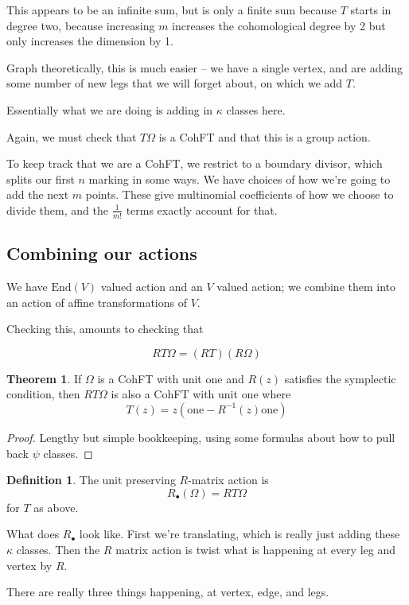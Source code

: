 \documentclass{amsart}
\theoremstyle{definition}
\newtheorem{theorem}{Theorem}
\newtheorem{definition}{Definition}
\newcommand{\one}{\text{one}}
\newcommand{\End}{\text{End}}
\begin{document}
This appears to be an infinite sum, but is only a finite sum because $T$ starts in degree two, because increasing $m$ increases the cohomological degree by 2 but only increases the dimension by 1.

Graph theoretically, this is much easier -- we have a single vertex, and are adding some number of new legs that we will forget about, on which we add $T$.

Essentially what we are doing is adding in $\kappa$ classes here.

Again, we must check that $T\Omega$ is a CohFT and that this is a group action.

To keep track that we are a CohFT, we restrict to a boundary divisor, which splits our first $n$ marking in some ways.  We have choices of how we're going to add the next $m$ points.  These give multinomial coefficients of how we choose to divide them, and the $\frac{1}{m!}$ terms exactly account for that.

\subsection{Combining our actions}

We have $\End(V)$ valued action and an $V$ valued action; we combine them into an action of affine transformations of $V$.

Checking this, amounts to checking that

$$RT\Omega=(RT)(R\Omega)$$

\begin{theorem}
If $\Omega$ is a CohFT with unit $\one$ and $R(z)$ satisfies the symplectic condition, then $RT\Omega$ is also a CohFT with unit $\one$ where
$$T(z)=z(\one-R^{-1}(z)\one)$$
\end{theorem}
\begin{proof}
Lengthy but simple bookkeeping, using some formulas about how to pull back $\psi$ classes.
\end{proof}

\begin{definition}
The unit preserving $R$-matrix action is 
$$R_\bullet(\Omega)=RT\Omega$$
for $T$ as above.
\end{definition}

What does $R_\bullet$ look like.  First we're translating, which is really just adding these $\kappa$ classes.  
Then the $R$ matrix action is twist what is happening at every leg and vertex by $R$.

There are really three things happening, at vertex, edge, and legs.
\end{document}
